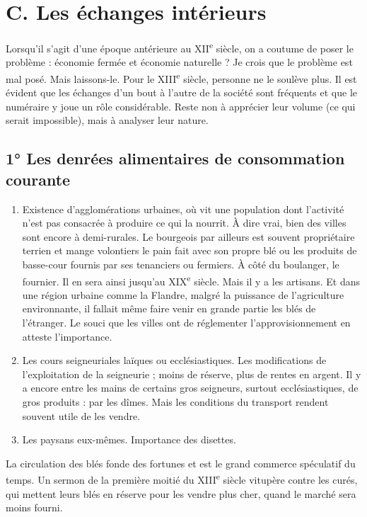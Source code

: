 \documentclass[french,twoside]{book} %
\def\bignobreak{\ifdim\lastskip<\bigskipamount
  \removelastskip\nopagebreak\bigskip\fi}
\newcommand{\labelblock}[1]{\bigbreak{\color{rubric}\noindent\textbf{#1}\par}\bignobreak}
\begin{document}
\section[C. Les échanges intérieurs]{C. Les échanges intérieurs}
\label{c09c}
\noindent Lorsqu’il s’agit d’une époque antérieure au XII\textsuperscript{e} siècle, on a coutume de poser le problème : économie fermée et économie naturelle ? Je crois que le problème est mal posé. Mais laissons-le. Pour le XIII\textsuperscript{e} siècle, personne ne le soulève plus. Il est évident que les échanges d’un bout à l’autre de la société sont fréquents et que le numéraire y joue un rôle considérable. Reste non à apprécier leur volume (ce qui serait impossible), mais à analyser leur nature.\par

\labelblock{Quels sont les principaux objets des échanges ?}

\subsection[1° Les denrées alimentaires de consommation courante]{1° Les denrées alimentaires de consommation courante}

\begin{enumerate}[itemsep=0pt,]
\item Existence d’agglomérations urbaines, où vit une population dont l’activité n’est pas consacrée à produire ce qui la nourrit. À dire vrai, bien des villes sont encore à demi-rurales. Le bourgeois par ailleurs est souvent propriétaire terrien et mange volontiers le pain fait avec son propre blé ou les produits de basse-cour fournis par ses tenanciers ou fermiers. À côté du boulanger, le fournier. Il en sera ainsi jusqu’au XIX\textsuperscript{e} siècle. Mais il y a les artisans. Et dans une région urbaine comme la Flandre, malgré la puissance de l’agriculture environnante, il fallait même faire venir en grande partie les blés de l’étranger. Le souci que les villes ont de réglementer l’approvisionnement en atteste l’importance.
\item Les cours seigneuriales laïques ou ecclésiastiques. Les modifications de l’exploitation de la seigneurie ; moins de réserve, plus de rentes en argent. Il y a encore entre les mains de certains gros seigneurs, surtout ecclésiastiques, de gros produits : par les dîmes. Mais les conditions du transport rendent souvent utile de les vendre.
\item  {}
\label{p90} Les paysans eux-mêmes. Importance des disettes.

\end{enumerate}\noindent La circulation des blés fonde des fortunes et est le grand commerce spéculatif du temps. Un sermon de la première moitié du XIII\textsuperscript{e} siècle vitupère contre les curés, qui mettent leurs blés en réserve pour les vendre plus cher, quand le marché sera moins fourni.
\end{document}
